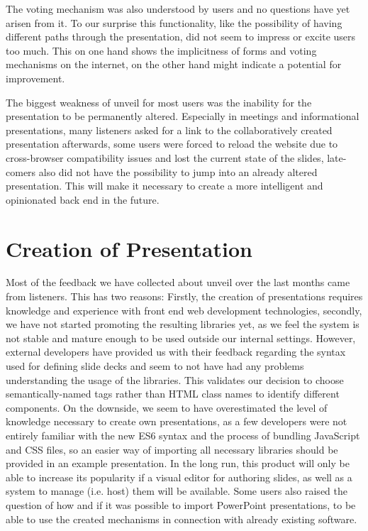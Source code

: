 The voting mechanism was also understood by users and no questions have yet arisen from it. To our surprise this functionality, like the possibility of having different paths through the presentation, did not seem to impress or excite users too much. This on one hand shows the implicitness of forms and voting mechanisms on the internet, on the other hand might indicate a potential for improvement.

The biggest weakness of unveil for most users was the inability for the presentation to be permanently altered. Especially in meetings and informational presentations, many listeners asked for a link to the collaboratively created presentation afterwards, some users were forced to reload the website due to cross-browser compatibility issues and lost the current state of the slides, late-comers also did not have the possibility to jump into an already altered presentation. This will make it necessary to create a more intelligent and opinionated back end in the future.

\section{Creation of Presentation}
\label{sec:discussion-dev}

Most of the feedback we have collected about unveil over the last months came from listeners. This has two reasons: Firstly, the creation of presentations requires knowledge and experience with front end web development technologies, secondly, we have not started promoting the resulting libraries yet, as we feel the system is not stable and mature enough to be used outside our internal settings. However, external developers have provided us with their feedback regarding the syntax used for defining slide decks and seem to not have had any problems understanding the usage of the libraries. This validates our decision to choose semantically-named tags rather than HTML class names to identify different components. On the downside, we seem to have overestimated the level of knowledge necessary to create own presentations, as a few developers were not entirely familiar with the new ES6 syntax and the process of bundling JavaScript and CSS files, so an easier way of importing all necessary libraries should be provided in an example presentation.
In the long run, this product will only be able to increase its popularity if a visual editor for authoring slides, as well as a system to manage (i.e. host) them will be available. Some users also raised the question of how and if it was possible to import PowerPoint presentations, to be able to use the created mechanisms in connection with already existing software.

